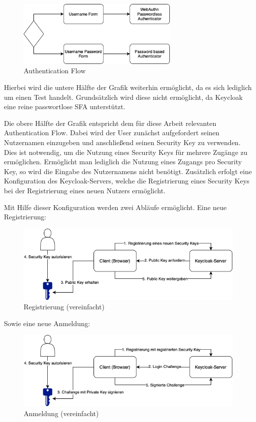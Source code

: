 \begin{figure}[h]
	\centering 
	\includegraphics[width=0.7\textwidth]{img/abbildungen/authentication_flow.png}
	\captionsetup{format=hang}
	\caption{Authentication Flow}
\end{figure}

Hierbei wird die untere Hälfte der Grafik weiterhin ermöglicht, da es sich lediglich um einen Test handelt. Grundsätzlich wird diese nicht ermöglicht, da Keycloak eine reine passwortlose \ac{SFA} unterstützt.

Die obere Hälfte der Grafik entspricht dem für diese Arbeit relevanten Authentication Flow. Dabei wird der User zunächst aufgefordert seinen Nutzernamen einzugeben und anschließend seinen Security Key zu verwenden. Dies ist notwendig, um die Nutzung eines Security Keys für mehrere Zugänge zu ermöglichen. Ermöglicht man lediglich die Nutzung eines Zugangs pro Security Key, so wird die Eingabe des Nutzernamens nicht benötigt. Zusätzlich erfolgt eine Konfiguration des Keycloak-Servers, welche die Registrierung eines Security Keys bei der Registrierung eines neuen Nutzers ermöglicht.

Mit Hilfe dieser Konfiguration werden zwei Abläufe ermöglicht. Eine neue Registrierung:

\begin{figure}[H]
	\centering 
	\includegraphics[width=1\textwidth]{img/abbildungen/register_simplified.png}
	\captionsetup{format=hang}
	\caption{Registrierung (vereinfacht)}
\end{figure}

Sowie eine neue Anmeldung:

\begin{figure}[H]
	\centering 
	\includegraphics[width=1\textwidth]{img/abbildungen/login_simplified.png}
	\captionsetup{format=hang}
	\caption{Anmeldung (vereinfacht)}
\end{figure}

